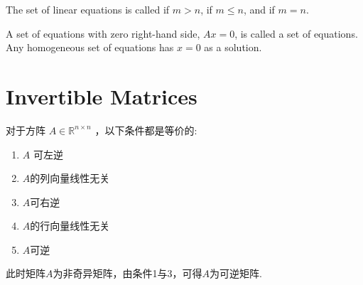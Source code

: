     The set
    of linear equations is called  if $ m>n $,   if $m \leq n$, and  if $m = n$.

    A set of equations with zero right-hand side, $ A x=0 $, is called a  set of equations. Any homogeneous set of equations has $ x=0 $ as a solution.

\section{Invertible Matrices}

\begin{theorem}
    对于方阵 $ A \in \mathbb{R}^{n \times n} $ ，以下条件都是等价的:

    \begin{enumerate}
        \item $ A $ 可左逆
        \item $A$的列向量线性无关
        \item $A$可右逆
        \item $A$的行向量线性无关
        \item $A$可逆
    \end{enumerate}

    此时矩阵$A$为非奇异矩阵，由条件1与3，可得$A$为可逆矩阵. 
\end{theorem}

